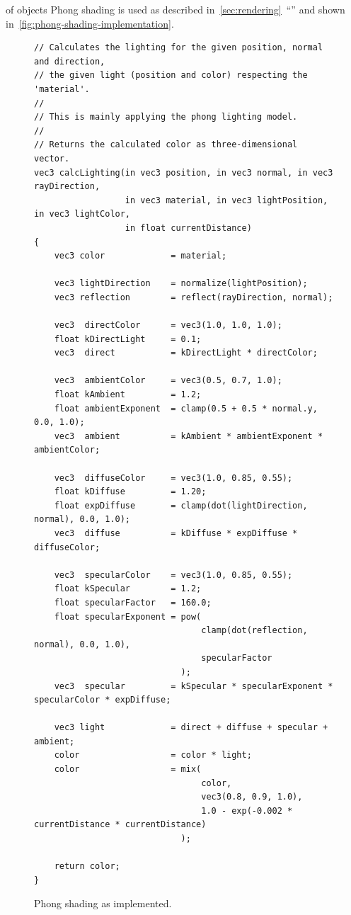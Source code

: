 \documentclass[%
    a4paper,    %
    justified,  %
    nobib,      %
    openany     %
]{tufte-book}
\makeatletter
\renewcommand{\label}[1]{\@tufte@label{##1}}%
\makeatother
\begin{document}
\newpage{}

 of objects Phong shading is used as
described in~\autoref{sec:rendering}~\enquote{}
and shown in~\cref{fig:phong-shading-implementation}.

\begin{figure}
  \begin{verbatim}
// Calculates the lighting for the given position, normal and direction,
// the given light (position and color) respecting the 'material'.
//
// This is mainly applying the phong lighting model.
//
// Returns the calculated color as three-dimensional vector.
vec3 calcLighting(in vec3 position, in vec3 normal, in vec3 rayDirection,
                  in vec3 material, in vec3 lightPosition, in vec3 lightColor,
                  in float currentDistance)
{
    vec3 color             = material;

    vec3 lightDirection    = normalize(lightPosition);
    vec3 reflection        = reflect(rayDirection, normal);

    vec3  directColor      = vec3(1.0, 1.0, 1.0);
    float kDirectLight     = 0.1;
    vec3  direct           = kDirectLight * directColor;

    vec3  ambientColor     = vec3(0.5, 0.7, 1.0);
    float kAmbient         = 1.2;
    float ambientExponent  = clamp(0.5 + 0.5 * normal.y, 0.0, 1.0);
    vec3  ambient          = kAmbient * ambientExponent * ambientColor;

    vec3  diffuseColor     = vec3(1.0, 0.85, 0.55);
    float kDiffuse         = 1.20;
    float expDiffuse       = clamp(dot(lightDirection, normal), 0.0, 1.0);
    vec3  diffuse          = kDiffuse * expDiffuse * diffuseColor;

    vec3  specularColor    = vec3(1.0, 0.85, 0.55);
    float kSpecular        = 1.2;
    float specularFactor   = 160.0;
    float specularExponent = pow(
                                 clamp(dot(reflection, normal), 0.0, 1.0),
                                 specularFactor
                             );
    vec3  specular         = kSpecular * specularExponent * specularColor * expDiffuse;

    vec3 light             = direct + diffuse + specular + ambient;
    color                  = color * light;
    color                  = mix(
                                 color,
                                 vec3(0.8, 0.9, 1.0),
                                 1.0 - exp(-0.002 * currentDistance * currentDistance)
                             );

    return color;
}
  \end{verbatim}
\caption{Phong shading as implemented.}
\label{fig:phong-shading-implementation}
\end{figure}
\end{document}
